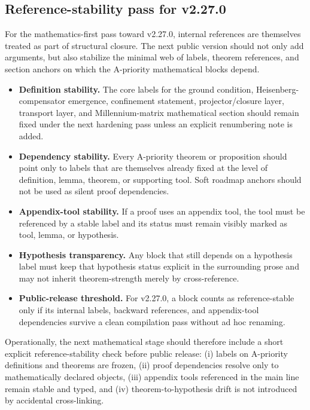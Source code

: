 \subsection*{Reference-stability pass for v2.27.0}

For the mathematics-first pass toward v2.27.0, internal references are themselves treated as part of structural closure. The next public version should not only add arguments, but also stabilize the minimal web of labels, theorem references, and section anchors on which the A-priority mathematical blocks depend.

\begin{itemize}
  \item \textbf{Definition stability.} The core labels for the ground condition, Heisenberg-compensator emergence, confinement statement, projector/closure layer, transport layer, and Millennium-matrix mathematical section should remain fixed under the next hardening pass unless an explicit renumbering note is added.
  \item \textbf{Dependency stability.} Every A-priority theorem or proposition should point only to labels that are themselves already fixed at the level of definition, lemma, theorem, or supporting tool. Soft roadmap anchors should not be used as silent proof dependencies.
  \item \textbf{Appendix-tool stability.} If a proof uses an appendix tool, the tool must be referenced by a stable label and its status must remain visibly marked as tool, lemma, or hypothesis.
  \item \textbf{Hypothesis transparency.} Any block that still depends on a hypothesis label must keep that hypothesis status explicit in the surrounding prose and may not inherit theorem-strength merely by cross-reference.
  \item \textbf{Public-release threshold.} For v2.27.0, a block counts as reference-stable only if its internal labels, backward references, and appendix-tool dependencies survive a clean compilation pass without ad hoc renaming.
\end{itemize}

Operationally, the next mathematical stage should therefore include a short explicit reference-stability check before public release: (i) labels on A-priority definitions and theorems are frozen, (ii) proof dependencies resolve only to mathematically declared objects, (iii) appendix tools referenced in the main line remain stable and typed, and (iv) theorem-to-hypothesis drift is not introduced by accidental cross-linking.


